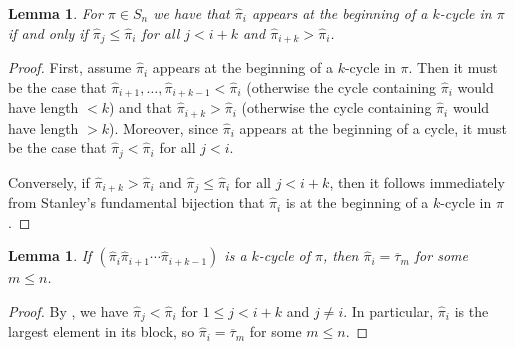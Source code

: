 \documentclass{article}
\numberwithin{theorem}{section}
\newtheorem{lemma}[theorem]{Lemma}
\theoremstyle{definition}
\newcommand\pihat{\hat{\pi}}
\begin{document}
\begin{lemma}\label{lem:k-cycles}
    For $\pi \in S_n$ we have that $\pihat_i$ appears at the beginning of a $k$-cycle in $\pi$ if and only if
        $\pihat_j \le \pihat_i$ for all $j < i + k$ and
        $\pihat_{i+k} > \pihat_i$.
\end{lemma}
\begin{proof}
    First, assume $\pihat_i$ appears at the beginning of a $k$-cycle in $\pi$. Then it must be the case that $\pihat_{i+1},\ldots,\pihat_{i+k-1} < \pihat_i$ (otherwise the cycle containing $\pihat_i$ would have length $<k$) and that $\pihat_{i+k} > \pihat_i$ (otherwise the cycle containing $\pihat_i$ would have length $>k$). Moreover, since $\pihat_i$ appears at the beginning of a cycle, it must be the case that $\pihat_j < \pihat_i$ for all $j < i$.

    Conversely, if $\pihat_{i+k} > \pihat_i$ and $\pihat_j \le \pihat_i$ for all $j < i+k$, then it follows immediately from Stanley's fundamental bijection that $\pihat_i$ is at the beginning of a $k$-cycle in $\pi$.
\end{proof}

\begin{lemma}
    \label{lem:tauStartsKCycle}
    If $\left(\pihat_i \pihat_{i+1} \cdots \pihat_{i+k-1} \right)$ is a $k$-cycle of $\pi$, then $\pihat_i = \overline\tau_m$ for some $m \leq n$.
\end{lemma}
\begin{proof}
    By , we have $\pihat_j < \pihat_i$ for $1 \le j < i+k$ and $j \neq i$. In particular, $\pihat_i$ is the largest element in its block, so $\pihat_i = \overline\tau_m$ for some $m \le n$.
\end{proof}
\end{document}

